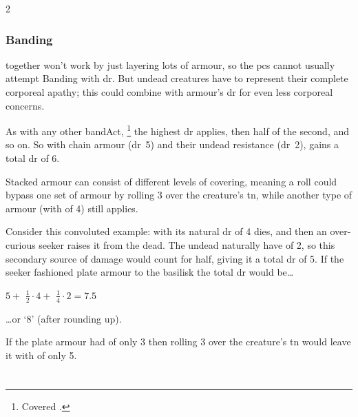 \begin{multicols}{2}
\subsubsection{Banding }
\label{bandingArmour}
together won't work by just layering lots of armour, so the \glspl{pc} cannot usually attempt Banding with \gls{dr}.
But undead creatures have  to represent their complete corporeal apathy; this could combine with armour's \gls{dr} for even less corporeal concerns.

As with any other \gls{bandAct},%
\footnote{Covered .}
the highest \gls{dr} applies, then half of the second, and so on.
So  with chain armour (\gls{dr}~5) and their undead resistance (\gls{dr}~2), gains a total \gls{dr} of 6.

Stacked armour can consist of different levels of \gls{covering}, meaning a roll could bypass one set of armour by rolling 3 over the creature's \gls{tn}, while another type of armour (with  of 4) still applies.

Consider this convoluted example:  with its natural \gls{dr} of 4 dies, and then an over-curious \gls{seeker} raises it from the dead.
The undead naturally have  of 2, so this secondary source of damage would count for half, giving it a total \gls{dr} of 5.
If the \gls{seeker} fashioned plate armour to the \gls{basilisk} the total \gls{dr} would be\ldots

\null
\medskip

\begin{center}
  \LARGE $5 + $ \Large$\frac{1}{2}\cdot4 + $ \normalsize$\frac{1}{4}\cdot2 =  7.5$
\end{center}

\ldots or `8' (after rounding up).

If the plate armour had  of only 3 then rolling 3 over the creature's \gls{tn} would leave it with  of only 5.

\end{multicols}


\section{}

